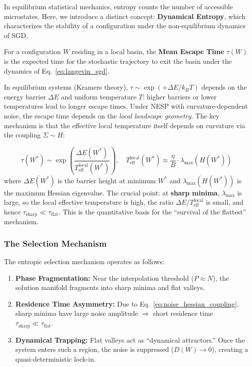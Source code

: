 \documentclass[
  journal=largetwo,
  simfonts=false,
  year=2025,
  volume=37,
]{cup-journal}
\begin{document}
In equilibrium statistical mechanics, entropy counts the number of accessible microstates. Here, we introduce a distinct concept: \textbf{Dynamical Entropy}, which characterizes the stability of a configuration under the non-equilibrium dynamics of SGD.

\begin{definition}
For a configuration $W$ residing in a local basin, the \textbf{Mean Escape Time} $\tau(W)$ is the expected time for the stochastic trajectory to exit the basin under the dynamics of Eq.~\eqref{eq:langevin_sgd}.
\end{definition}

In equilibrium systems (Kramers theory), $\tau \sim \exp(+\Delta E / k_B T)$ depends on the energy barrier $\Delta E$ and uniform temperature $T$: higher barriers or lower temperatures lead to longer escape times. Under NESP with curvature-dependent noise, the escape time depends on the \textit{local landscape geometry}. The key mechanism is that the effective local temperature itself depends on curvature via the coupling $\Sigma \sim H$:

\begin{equation}\label{eq:escape_time_nesp}
    \tau(W^*) \sim \exp\left( \frac{\Delta E(W^*)}{T_{\text{eff}}^{\text{local}}(W^*)} \right), \quad T_{\text{eff}}^{\text{local}}(W^*) \approx \frac{\eta}{B} \cdot \lambda_{\max}(H(W^*))
\end{equation}
where $\Delta E(W^*)$ is the barrier height at minimum $W^*$ and $\lambda_{\max}(H(W^*))$ is the maximum Hessian eigenvalue. The crucial point: at \textbf{sharp minima}, $\lambda_{\max}$ is large, so the local effective temperature is high, the ratio $\Delta E / T_{\text{eff}}^{\text{local}}$ is small, and hence $\tau_{\text{sharp}} \ll \tau_{\text{flat}}$. This is the quantitative basis for the ``survival of the flattest'' mechanism.



\subsubsection{The Selection Mechanism}

The entropic selection mechanism operates as follows:

\begin{enumerate}
    \item \textbf{Phase Fragmentation:} Near the interpolation threshold ($P \approx N$), the solution manifold fragments into sharp minima and flat valleys.
    
    \item \textbf{Residence Time Asymmetry:} Due to Eq.~\eqref{eq:noise_hessian_coupling}, sharp minima have large noise amplitude $\Rightarrow$ short residence time $\tau_{\text{sharp}} \ll \tau_{\text{flat}}$.
    
    \item \textbf{Dynamical Trapping:} Flat valleys act as ``dynamical attractors.'' Once the system enters such a region, the noise is suppressed ($D(W) \to 0$), creating a quasi-deterministic lock-in.
\end{enumerate}
\end{document}
